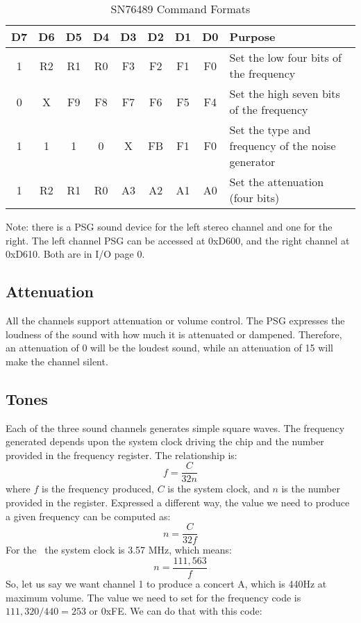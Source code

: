 \begin{table}[h]
	\begin{center}
		\begin{tabular}{|c|c|c|c|c|c|c|c|l|} \hline
			D7 & D6 & D5 & D4 & D3 & D2 & D1 & D0 & Purpose \\ \hline \hline
			1 & R2 & R1 & R0 & F3 & F2 & F1 & F0 & Set the low four bits of the frequency \\ \hline
			0 & X & F9 & F8 & F7 & F6 & F5 & F4 & Set the high seven bits of the frequency \\ \hline
			1 & 1 & 1 & 0 & X & FB & F1 & F0 & Set the type and frequency of the noise generator \\ \hline
			1 & R2 & R1 & R0 & A3 & A2 & A1 & A0 & Set the attenuation (four bits) \\ \hline
		\end{tabular}
		\caption{SN76489 Command Formats}
	\end{center}
	\label{tab:psg_commands}
\end{table}

Note: there is a PSG sound device for the left stereo channel and one for the right. The left channel PSG can be accessed at 0xD600, and the right channel at 0xD610. Both are in I/O page 0.

\subsection{Attenuation}

All the channels support attenuation or volume control. The PSG expresses the loudness of the sound with how much it is attenuated or dampened. Therefore, an attenuation of 0 will be the loudest sound, while an attenuation of 15 will make the channel silent.

\subsection{Tones}

Each of the three sound channels generates simple square waves. The frequency generated depends upon the system clock driving the chip and the number provided in the frequency register. The relationship is:
\[
f = \frac{C}{32n}
\]
where $f$ is the frequency produced, $C$ is the system clock, and $n$ is the number provided in the register. Expressed a different way, the value we need to produce a given frequency can be computed as:
\[
n = \frac{C}{32f}
\]
For the \jr\ the system clock is 3.57 MHz, which means:
\[
n = \frac{111,563}{f}
\]
So, let us say we want channel 1 to produce a concert A, which is 440Hz at maximum volume. The value we need to set for the frequency code is $111,320 / 440 = 253$ or 0xFE. We can do that with this code:

